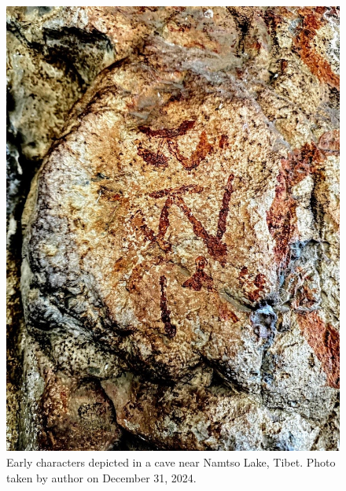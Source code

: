 \documentclass[11pt,a4paper,oneside]{report}
\begin{document}
\label{app: rock-art}
 \begin{figure}[H]
    \centering
    \includegraphics[width=1\linewidth]{Images/tibetan_rock_letters.jpg}
     \caption[Ancient Tibetan Rock Writings]{Early characters depicted in a cave near Namtso Lake, Tibet. Photo taken by author on December 31, 2024.}
\end{figure}
\end{document}
